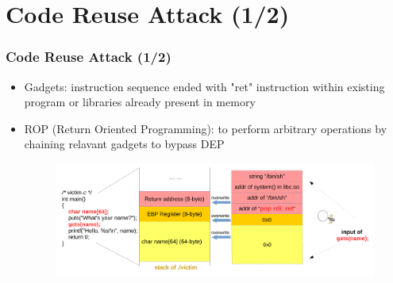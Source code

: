 \documentclass[aspectratio=169]{beamer}
\begin{document}
\section{Code Reuse Attack (1/2)}
\begin{frame}
\frametitle{Code Reuse Attack (1/2)}
\begin{itemize}
\item Gadgets: instruction sequence ended with "ret" instruction within existing program or libraries already present in memory
\item ROP (Return Oriented Programming): to perform arbitrary operations by chaining relavant gadgets to bypass DEP 
\begin{figure}
\includegraphics[width=1.0\linewidth]{figures/reuse.pdf}
\end{figure}
\end{itemize}
\end{frame}

\end{document}
